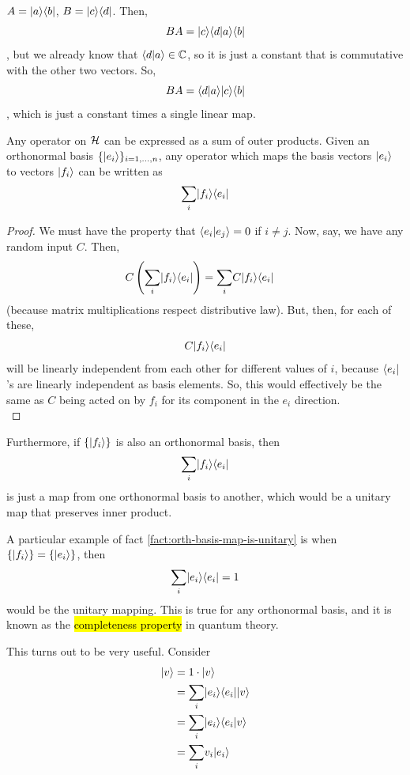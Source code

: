 \documentclass[12pt]{article}
\begin{document}
\begin{proposition}
$A = \kb{a}{b}$, $B = \kb{c}{d}$. Then, $$
BA = \Ket{c}\bk{d}{a}\Bra{b}
$$, but we already know that $\bk{d}{a}\in \CC$, so it is just a constant that is commutative with the other two vectors. So, $$
BA = \bk{d}{a}\kb{c}{b}
$$, which is just a constant times a single linear map.
\end{proposition}

\begin{proposition}\label{prop:can-be-expressed-as-outer-products}
Any operator on $\HHH$ can be expressed as a sum of outer products. Given an orthonormal basis $\{\Ket{e_i}\}_{i= 1, \ldots, n}$, any operator which maps the basis vectors $\Ket{e_i}$ to vectors $\Ket{f_i}$ can be written as $$
\underset{i}{\sum} \kb{f_i}{e_i}
$$
\end{proposition}
\begin{proof}
We must have the property that $\bk{e_i}{e_j} = 0$ if $i\neq j$. Now, say, we have any random input $C$. Then, $$
\begin{aligned}
C\prt{\underset{i}{\sum} \kb{f_i}{e_i}}
    &= \underset{i}{\sum} C\kb{f_i}{e_i}
\end{aligned}
$$ (because matrix multiplications respect distributive law). But, then, for each of these, $$C\kb{f_i}{e_i}$$ will be linearly independent from each other for different values of $i$, because $\Bra{e_i}$'s are linearly independent as basis elements. So, this would effectively be the same as $C$ being acted on by $f_i$ for its component in the $e_i$ direction.\\
\end{proof}

\begin{fact}\label{fact:orth-basis-map-is-unitary}
Furthermore, if $\{\Ket{f_i}\}$ is also an orthonormal basis, then $$
\underset{i}{\sum} \kb{f_i}{e_i}
$$ is just a map from one orthonormal basis to another, which would be a unitary map that preserves inner product.
\end{fact}

\begin{fact}[Completeness]
A particular example of fact \ref{fact:orth-basis-map-is-unitary} is when $\{\Ket{f_i}\} = \{\Ket{e_i}\}$, then $$
\underset{i}{\sum} \kb{e_i}{e_i} = 1
$$ would be the unitary mapping. This is true for any orthonormal basis, and it is known as the \hl{completeness property} in quantum theory.

This turns out to be very useful. Consider $$
\begin{aligned}
\Ket{v}
    &= 1\cdot \Ket{v}\\
    &= \underset{i}{\sum} \kb{e_i}{e_i}\Ket{v}\\
    &= \underset{i}{\sum} \Ket{e_i}\bk{e_i}{v}\\
    &= \underset{i}{\sum} v_i\Ket{e_i}
\end{aligned}
$$
\end{fact}
\end{document}
